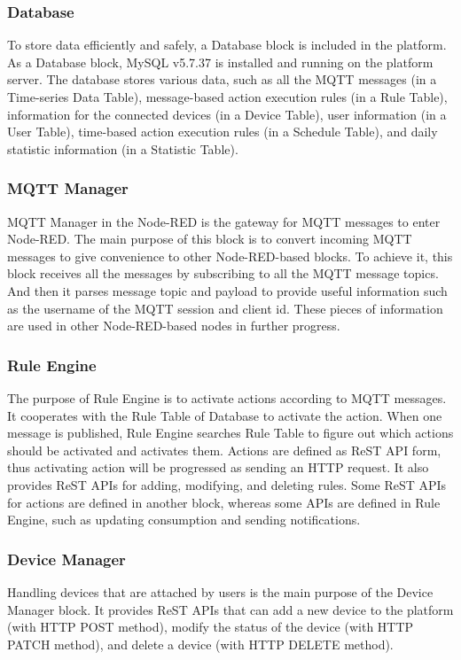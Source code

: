 \documentclass[conference]{IEEEtran}
\begin{document}
\subsubsection{Database}
\hfill \break To store data efficiently and safely, a Database block is included in the platform. As a Database block, MySQL v5.7.37 is installed and running on the platform server. The database stores various data, such as all the MQTT messages (in a Time-series Data Table), message-based action execution rules (in a Rule Table), information for the connected devices (in a Device Table), user information (in a User Table), time-based action execution rules (in a Schedule Table), and daily statistic information (in a Statistic Table).

\subsubsection{MQTT Manager}
\hfill \break MQTT Manager in the Node-RED is the gateway for MQTT messages to enter Node-RED. The main purpose of this block is to convert incoming MQTT messages to give convenience to other Node-RED-based blocks. To achieve it, this block receives all the messages by subscribing to all the MQTT message topics. And then it parses message topic and payload to provide useful information such as the username of the MQTT session and client id. These pieces of information are used in other Node-RED-based nodes in further progress.

\subsubsection{Rule Engine}
\hfill \break The purpose of Rule Engine is to activate actions according to MQTT messages. It cooperates with the Rule Table of Database to activate the action. When one message is published, Rule Engine searches Rule Table to figure out which actions should be activated and activates them. Actions are defined as ReST API form, thus activating action will be progressed as sending an HTTP request. It also provides ReST APIs for adding, modifying, and deleting rules. Some ReST APIs for actions are defined in another block, whereas some APIs are defined in Rule Engine, such as updating consumption and sending notifications.

\subsubsection{Device Manager}
\hfill \break Handling devices that are attached by users is the main purpose of the Device Manager block. It provides ReST APIs that can add a new device to the platform (with HTTP POST method), modify the status of the device (with HTTP PATCH method), and delete a device (with HTTP DELETE method).
\end{document}
